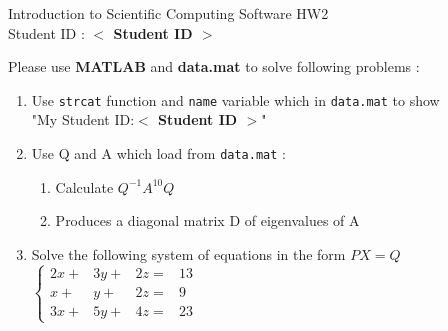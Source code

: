 \documentclass[12pt,a4paper]{article}
\newcommand{\placeholder}[1]{\textbf{$<$ #1 $>$}}
\newcommand{\idnumber}{\placeholder{Student ID}}
\begin{document}
\begin{flushleft}Introduction to Scientific Computing Software HW2
\\Student ID : \idnumber{}\end{flushleft}

Please use \textbf{MATLAB} and \textbf{data.mat} to solve following problems : 
\begin{enumerate}
\item Use \texttt{strcat} function and \texttt{name} variable which in \texttt{data.mat} to show \\"My Student ID:\idnumber{}"
\item Use Q and A which load from \texttt{data.mat} :
\begin{enumerate}
\item  Calculate $Q^{-1}A^{10}Q$
\item  Produces a diagonal matrix D of eigenvalues of A
\end{enumerate}
\item Solve the following system of equations in the form $PX=Q$ \\[1em] $\displaystyle{\left\{\begin{array}{rrrl}2x+&3y+&2z=&13\\x+&y+&2z=&9\\3x+&5y+&4z=&23\end{array}\right.}$
\end{enumerate}
\end{document}
